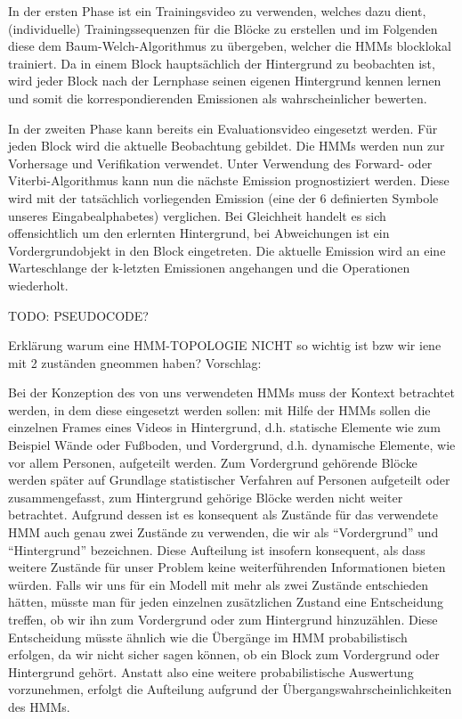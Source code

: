In der ersten Phase ist ein Trainingsvideo zu verwenden, welches dazu dient, (individuelle) Trainingssequenzen für die Blöcke zu erstellen und im Folgenden diese dem Baum-Welch-Algorithmus zu übergeben, welcher die HMMs blocklokal trainiert. Da in einem Block hauptsächlich der Hintergrund zu beobachten ist, wird jeder Block nach der Lernphase seinen eigenen Hintergrund kennen lernen und somit die korrespondierenden Emissionen als wahrscheinlicher bewerten.

In der zweiten Phase kann bereits ein Evaluationsvideo eingesetzt werden. Für jeden Block wird die aktuelle Beobachtung gebildet. Die HMMs werden nun zur Vorhersage und Verifikation verwendet. Unter Verwendung des Forward- oder Viterbi-Algorithmus kann nun die nächste Emission prognostiziert werden. Diese wird mit der tatsächlich vorliegenden Emission (eine der 6 definierten Symbole unseres Eingabealphabetes) verglichen. Bei Gleichheit handelt es sich offensichtlich um den erlernten Hintergrund, bei Abweichungen ist ein Vordergrundobjekt in den Block eingetreten. Die aktuelle Emission wird an eine Warteschlange der k-letzten Emissionen angehangen und die Operationen wiederholt.



TODO: PSEUDOCODE?

Erklärung warum eine HMM-TOPOLOGIE NICHT so wichtig ist bzw wir iene mit 2 zuständen gneommen haben? 
Vorschlag:

Bei der Konzeption des von uns verwendeten HMMs muss der Kontext betrachtet werden, in dem diese eingesetzt werden sollen: mit Hilfe der HMMs sollen die einzelnen  Frames eines Videos in Hintergrund, d.h. statische Elemente wie zum Beispiel Wände oder Fußboden, und Vordergrund, d.h. dynamische Elemente, wie vor allem Personen, aufgeteilt werden.
Zum Vordergrund gehörende Blöcke werden später auf Grundlage statistischer Verfahren auf Personen aufgeteilt oder zusammengefasst, zum Hintergrund gehörige Blöcke werden nicht weiter betrachtet.
Aufgrund dessen ist es konsequent als Zustände für das verwendete HMM auch genau zwei Zustände zu verwenden, die wir als “Vordergrund” und “Hintergrund” bezeichnen.
Diese Aufteilung ist insofern konsequent, als dass weitere Zustände für unser Problem keine weiterführenden Informationen bieten würden.
Falls wir uns für ein Modell mit mehr als zwei Zustände entschieden hätten, müsste man für jeden einzelnen zusätzlichen Zustand eine Entscheidung treffen, ob wir ihn zum Vordergrund oder zum Hintergrund hinzuzählen.
Diese Entscheidung müsste ähnlich wie die Übergänge im HMM probabilistisch erfolgen, da wir nicht sicher sagen können, ob ein Block zum Vordergrund oder Hintergrund gehört.
Anstatt also eine weitere probabilistische Auswertung vorzunehmen, erfolgt die Aufteilung aufgrund der Übergangswahrscheinlichkeiten des HMMs.

